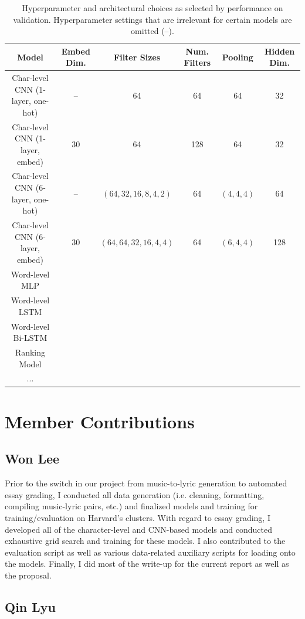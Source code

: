 \documentclass[10pt,psamsfonts]{amsart}
\theoremstyle{definition}
\theoremstyle{remark}
\numberwithin{equation}{section}
\begin{document}
\begin{table}
	\begin{tabular}{c|c|c|c|c|c}
		Model & Embed Dim. & Filter Sizes & Num. Filters & Pooling & Hidden Dim. \\\hline
		Char-level CNN (1-layer, one-hot) & -- & 64 & 64 & 64 & 32 \\
		Char-level CNN (1-layer, embed) &  30 & 64 & 128 & 64 & 32 \\
		Char-level CNN (6-layer, one-hot) & -- & $(64, 32, 16, 8, 4, 2)$ & 64 & $(4,4,4)$ & 64 \\
		Char-level CNN (6-layer, embed) & 30 & $(64, 64, 32, 16, 4, 4)$ & 64 & $(6,4,4)$ & 128 \\
		Word-level MLP  & & & & & \\
		Word-level LSTM  & & & & & \\
		Word-level Bi-LSTM  & & & & & \\
		Ranking Model & & & & & \\
		...  & & & & &
	\end{tabular}
	\caption{Hyperparameter and architectural choices as selected by performance on validation. Hyperparameter settings that are irrelevant for certain models are omitted (--).}
	\label{fig:params}
\end{table}


\section*{Member Contributions}

\subsection*{Won Lee}

Prior to the switch in our project from music-to-lyric generation to automated essay grading, I conducted all data generation (i.e. cleaning, formatting, compiling music-lyric pairs, etc.) and finalized models and training for training/evaluation on Harvard's clusters. With regard to essay grading, I developed all of the character-level and CNN-based models and conducted exhaustive grid search and training for these models. I also contributed to the evaluation script as well as various data-related auxiliary scripts for loading onto the models. Finally, I did most of the write-up for the current report as well as the proposal.

\subsection*{Qin Lyu}
\end{document}
